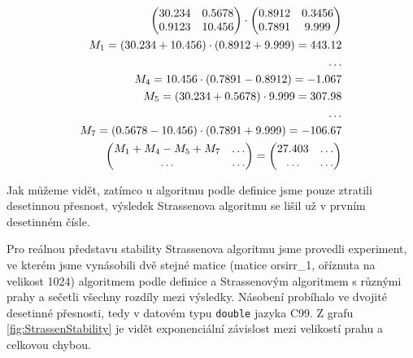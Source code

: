 \begin{align}
\begin{pmatrix}
 30.234 & 0.5678 \\
 0.9123 & 10.456
\end{pmatrix} \cdot \begin{pmatrix}
 0.8912 & 0.3456 \\
 0.7891 & 9.999
\end{pmatrix} \notag\\
M_{1} = (30.234 + 10.456) \cdot (0.8912 + 9.999) = 443.12  \notag\\
\hdots \notag\\
M_{4} = 10.456 \cdot (0.7891 - 0.8912) = -1.067 \notag\\
M_{5} = (30.234 + 0.5678) \cdot 9.999 = 307.98 \notag\\
\hdots \notag\\
M_{7} = (0.5678 - 10.456) \cdot (0.7891 + 9.999) = -106.67 \notag\\
 \begin{pmatrix}
 M_{1} + M_{4} - M_{5} + M_{7} & \hdots \\
 \hdots & \hdots
\end{pmatrix} = \begin{pmatrix}
 27.403 & \hdots \\
 \hdots & \hdots
\end{pmatrix} \notag
\end{align}


Jak můžeme vidět, zatímco u algoritmu podle definice jsme pouze ztratili desetinnou přesnost, výsledek Strassenova algoritmu se lišil už v prvním desetinném čísle. 

Pro reálnou představu stability Strassenova algoritmu jsme provedli experiment, ve kterém jsme vynásobili dvě stejné matice (matice orsirr\_1, oříznuta na velikost 1024) algoritmem podle definice a Strassenovým algoritmem s různými prahy a sečetli všechny rozdíly mezi výsledky. Násobení probíhalo ve dvojité desetinné přesnosti, tedy v datovém typu \texttt{double} jazyka C99. Z grafu \ref{fig:StrassenStability} je vidět exponenciální závislost mezi velikostí prahu a celkovou chybou.

